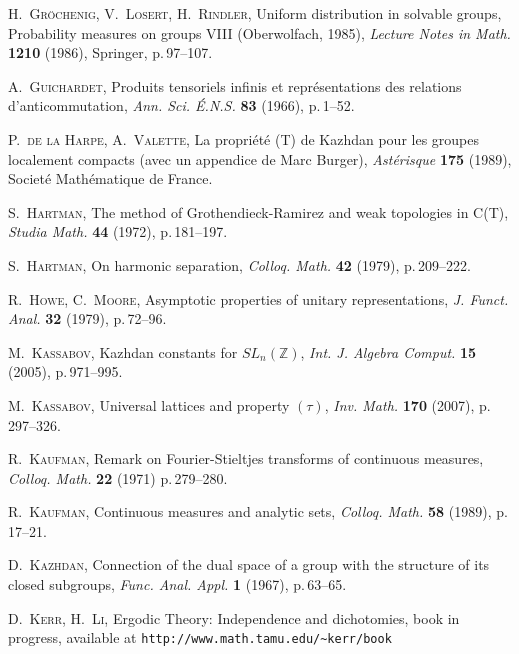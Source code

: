\documentclass[11pt,english,a4paper]{smfart}
\numberwithin{equation}{section}
\theoremstyle{definition}
\begin{document}
\begin{thebibliography}{99999}
{
\textsc{H.~Gr\"ochenig, V.~Losert, H.~Rindler,}
\newblock Uniform distribution in solvable groups,
\newblock Probability measures on groups VIII (Oberwolfach, 1985), 
\emph{Lecture Notes in Math.} \textbf{1210} (1986),  Springer,
p.\,97--107. 

 \textsc{A.~Guichardet,} 
\newblock Produits tensoriels infinis et repr\'esentations des relations 
d'anti\-com\-mutation,
\newblock \emph{Ann. Sci. \'E.N.S.} {\bf 83} (1966), p.\,1--52.

 \textsc{P.~de la Harpe, A.~Valette,} 
\newblock La propri\'et\'e (T) de Kazhdan pour les groupes localement compacts 
(avec un appendice de Marc Burger),
\newblock \emph{Ast\'erisque} {\bf 175} (1989), Societ\'e Math\'ematique de France. 

\textsc{S.~Hartman,} 
\newblock The method of Grothendieck-Ramirez and weak topologies in C(T), 
\newblock \emph{Studia Math.} \textbf{44} (1972), p.\,181--197. 

\textsc{S.~Hartman,} 
\newblock On harmonic separation,
\newblock \emph{Colloq. Math.} \textbf{42} (1979), p.\,209--222. 

\textsc{R.~Howe, C.~Moore,}
\newblock Asymptotic properties of unitary representations,
\newblock \emph{J. Funct. Anal.} \textbf{32} (1979), p.\,72--96. 

\textsc{M.~Kassabov,}
\newblock Kazhdan constants for $SL_n({\ensuremath{\mathbb Z}})$,
\newblock \emph{Int. J. Algebra Comput.} \textbf{15} (2005), p.\,971--995.

\textsc{M.~Kassabov,}
\newblock Universal lattices and property $(\tau )$,
\newblock \emph{Inv. Math.} \textbf{170} (2007), p.\,297--326.

\textsc{R.~Kaufman,}
\newblock Remark on Fourier-Stieltjes transforms of continuous measures, 
\newblock \emph{Colloq. Math.} \textbf{22} (1971) p.\,279--280.

\textsc{R.~Kaufman,} 
\newblock Continuous measures and analytic sets, 
\newblock \emph{Colloq. Math.} \textbf{58} (1989), p.\,17--21. 

\textsc{D.~Kazhdan,}
\newblock Connection of the dual space of a group with the structure of 
its closed subgroups,
\newblock \emph{Func. Anal. Appl.}  {\bf 1} (1967), p.\,63--65.

\textsc{D.~Kerr, H.~Li,}
\newblock Ergodic Theory: Independence and dichotomies, book in progress,
available at \verb=http://www.math.tamu.edu/~kerr/book=

}
\end{thebibliography}
\end{document}
